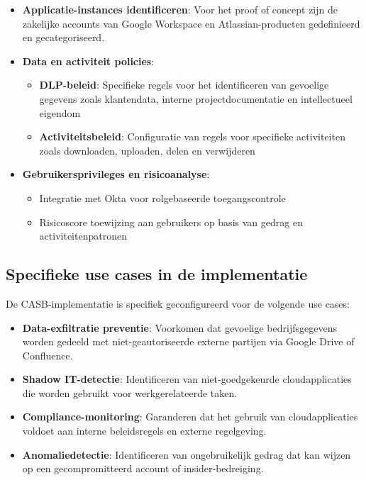 \begin{itemize}
    \item \textbf{Applicatie-instances identificeren}: Voor het proof of concept zijn de zakelijke accounts van Google Workspace en Atlassian-producten gedefinieerd en gecategoriseerd.

    \item \textbf{Data en activiteit policies}:
        \begin{itemize}
            \item \textbf{DLP-beleid}: Specifieke regels voor het identificeren van gevoelige gegevens zoals klantendata, interne projectdocumentatie en intellectueel eigendom
            \item \textbf{Activiteitsbeleid}: Configuratie van regels voor specifieke activiteiten zoals downloaden, uploaden, delen en verwijderen
        \end{itemize}

    \item \textbf{Gebruikersprivileges en risicoanalyse}:
        \begin{itemize}
            \item Integratie met Okta voor rolgebaseerde toegangscontrole
            \item Risicoscore toewijzing aan gebruikers op basis van gedrag en activiteitenpatronen
        \end{itemize}
\end{itemize}
\subsection{Specifieke use cases in de implementatie}

De CASB-implementatie is specifiek geconfigureerd voor de volgende use cases:

\begin{itemize}
    \item \textbf{Data-exfiltratie preventie}: Voorkomen dat gevoelige bedrijfsgegevens worden gedeeld met niet-geautoriseerde externe partijen via Google Drive of Confluence.

    \item \textbf{Shadow IT-detectie}: Identificeren van niet-goedgekeurde cloudapplicaties die worden gebruikt voor werkgerelateerde taken.

    \item \textbf{Compliance-monitoring}: Garanderen dat het gebruik van cloudapplicaties voldoet aan interne beleidsregels en externe regelgeving.

    \item \textbf{Anomaliedetectie}: Identificeren van ongebruikelijk gedrag dat kan wijzen op een gecompromitteerd account of insider-bedreiging.
\end{itemize}

